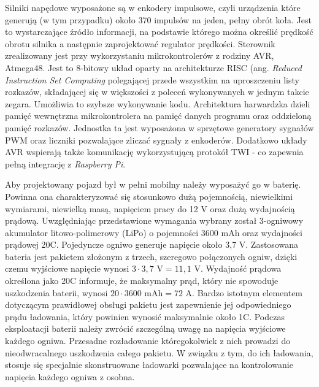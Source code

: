 Silniki napędowe wyposażone są w enkodery impulsowe, czyli  urządzenia które generują (w tym przypadku) około 370 impulsów na jeden, pełny obrót koła. Jest to wystarczające źródło informacji, na podstawie którego można określić prędkość obrotu silnika a następnie zaprojektować regulator prędkości. Sterownik zrealizowany jest przy wykorzystaniu mikrokontrolerów z rodziny AVR, Atmega48. Jest to 8-bitowy układ oparty na architekturze RISC (ang. \textit{Reduced Instruction Set Computing} polegającej przede wszystkim na uproszczeniu listy rozkazów, składającej się w większości z poleceń wykonywanych w jednym takcie zegara. Umożliwia to szybsze wykonywanie kodu. Architektura harwardzka dzieli pamięć wewnętrzna mikrokontrolera na pamięć danych programu oraz oddzieloną pamięć rozkazów. Jednostka ta jest wyposażona w sprzętowe generatory sygnałów PWM oraz liczniki pozwalające zliczać sygnały z enkoderów. Dodatkowo układy AVR wspierają także komunikację wykorzystującą protokół TWI - co zapewnia pełną integrację z \textit{Raspberry Pi}.

Aby projektowany pojazd był w pełni mobilny należy wyposażyć go w baterię. Powinna ona charakteryzować się stosunkowo dużą pojemnością, niewielkimi wymiarami, niewielką masą, napięciem pracy do 12 V oraz dużą wydajnością prądową. Uwzględniając przedstawione wymagania wybrany został 3-ogniwowy akumulator litowo-polimerowy (LiPo) o pojemności 3600 mAh oraz wydajności prądowej 20C. Pojedyncze ogniwo generuje napięcie około 3,7 V. Zastosowana bateria jest pakietem złożonym z trzech, szeregowo połączonych ogniw, dzięki czemu wyjściowe napięcie wynosi $3\cdot3,7$ V$ = 11,1$ V. Wydajność prądowa określona jako 20C informuje, że maksymalny prąd, który nie spowoduje uszkodzenia baterii, wynosi $20\cdot3600$ mAh$=72$ A. Bardzo istotnym elementem dotyczącym prawidłowej obsługi pakietu jest zapewnienie jej odpowiedniego prądu ładowania, który powinien wynosić maksymalnie około 1C. Podczas eksploatacji baterii należy zwrócić szczególną uwagę na napięcia wyjściowe każdego ogniwa. Przesadne rozładowanie któregokolwiek z nich prowadzi do nieodwracalnego uszkodzenia całego pakietu. W związku z tym, do ich ładowania, stosuje się specjalnie skonstruowane ładowarki pozwalające na kontrolowanie napięcia każdego ogniwa z osobna.
